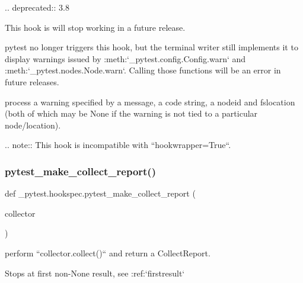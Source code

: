 \begin{DoxyVerb}.. deprecated:: 3.8

    This hook is will stop working in a future release.

    pytest no longer triggers this hook, but the
    terminal writer still implements it to display warnings issued by
    :meth:`_pytest.config.Config.warn` and :meth:`_pytest.nodes.Node.warn`. Calling those functions will be
    an error in future releases.

process a warning specified by a message, a code string,
a nodeid and fslocation (both of which may be None
if the warning is not tied to a particular node/location).

.. note::
    This hook is incompatible with ``hookwrapper=True``.
\end{DoxyVerb}
 \mbox{\label{namespace__pytest_1_1hookspec_aea73d01c864d52658935cde8e36bb423}} 
\subsubsection{\texorpdfstring{pytest\+\_\+make\+\_\+collect\+\_\+report()}{pytest\_make\_collect\_report()}}
{\footnotesize\ttfamily def \+\_\+pytest.\+hookspec.\+pytest\+\_\+make\+\_\+collect\+\_\+report (\begin{DoxyParamCaption}\item[{}]{collector }\end{DoxyParamCaption})}

\begin{DoxyVerb}perform ``collector.collect()`` and return a CollectReport.

Stops at first non-None result, see :ref:`firstresult` \end{DoxyVerb}
 \mbox{\label{namespace__pytest_1_1hookspec_a3ee04cfa542ef8a2d5070c585827209c}} 
